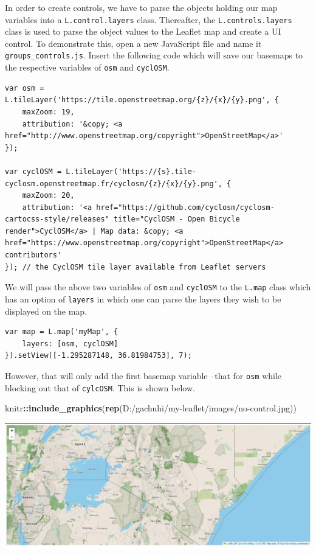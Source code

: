 \documentclass[
]{book}
\newenvironment{Shaded}{\begin{snugshade}}{\end{snugshade}}
\newcommand{\FunctionTok}[1]{\textcolor[rgb]{0.13,0.29,0.53}{\textbf{#1}}}
\newcommand{\NormalTok}[1]{#1}
\newcommand{\SpecialCharTok}[1]{\textcolor[rgb]{0.81,0.36,0.00}{\textbf{#1}}}
\newcommand{\StringTok}[1]{\textcolor[rgb]{0.31,0.60,0.02}{#1}}
\begin{document}
In order to create controls, we have to parse the objects holding our map variables into a \texttt{L.control.layers} class. Thereafter, the \texttt{L.controls.layers} class is used to parse the object values to the Leaflet map and create a UI control. To demonstrate this, open a new JavaScript file and name it \texttt{groups\_controls.js}. Insert the following code which will save our basemaps to the respective variables of \texttt{osm} and \texttt{cyclOSM}.

\begin{verbatim}
var osm = L.tileLayer('https://tile.openstreetmap.org/{z}/{x}/{y}.png', {
    maxZoom: 19,
    attribution: '&copy; <a href="http://www.openstreetmap.org/copyright">OpenStreetMap</a>'
});

var cyclOSM = L.tileLayer('https://{s}.tile-cyclosm.openstreetmap.fr/cyclosm/{z}/{x}/{y}.png', {
    maxZoom: 20,
    attribution: '<a href="https://github.com/cyclosm/cyclosm-cartocss-style/releases" title="CyclOSM - Open Bicycle render">CyclOSM</a> | Map data: &copy; <a href="https://www.openstreetmap.org/copyright">OpenStreetMap</a> contributors'
}); // the CyclOSM tile layer available from Leaflet servers
\end{verbatim}

We will pass the above two variables of \texttt{osm} and \texttt{cyclOSM} to the \texttt{L.map} class which has an option of \texttt{layers} in which one can parse the layers they wish to be displayed on the map.

\begin{verbatim}
var map = L.map('myMap', {
    layers: [osm, cyclOSM]
}).setView([-1.295287148, 36.81984753], 7);
\end{verbatim}

However, that will only add the first basemap variable --that for \texttt{osm} while blocking out that of \texttt{cylcOSM}. This is shown below.

\begin{Shaded}
\begin{Highlighting}[]
\NormalTok{knitr}\SpecialCharTok{::}\FunctionTok{include\_graphics}\NormalTok{(}\FunctionTok{rep}\NormalTok{(}\StringTok{\textquotesingle{}D:/gachuhi/my{-}leaflet/images/no{-}control.jpg\textquotesingle{}}\NormalTok{))}
\end{Highlighting}
\end{Shaded}

\includegraphics{../images/no-control.jpg}
\end{document}
